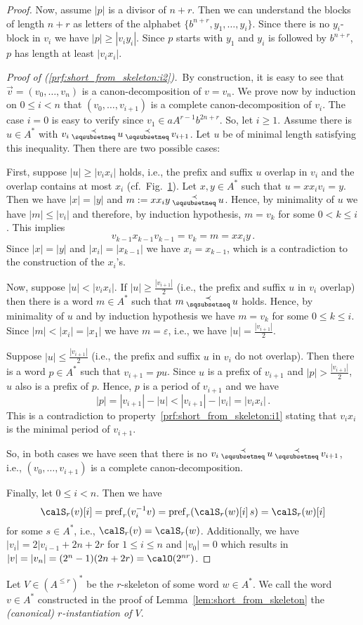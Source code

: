 \begin{proof}
	Now, assume $|p|$ is a divisor of $n+r$. Then we can understand the blocks of length $n+r$ as letters of the alphabet $\{b^{n+r},y_1,\dots,y_i\}$. Since there is no $y_i$-block in $v_i$ we have $|p|\geq|v_iy_i|$. Since $p$ starts with $y_1$ and $y_i$ is followed by $b^{n+r}$, $p$ has length at least $|v_ix_i|$.
	
	\emph{Proof of (\ref{prf:short_from_skeleton:i2}).}\ By construction, it is easy to see that $\vec{v}=(v_0,\dots,v_n)$ is a canon-decomposition of $v=v_n$. We prove now by induction on $0\leq i<n$ that $(v_0,\dots,v_{i+1})$ is a complete canon-decomposition of $v_i$. The case $i=0$ is easy to verify since $v_1\in aA^{r-1}b^{2n+r}$. So, let $i\geq1$. Assume there is $u\in A^*$ with $v_i\presuf u\presuf v_{i+1}$. Let $u$ be of minimal length satisfying this inequality. Then there are two possible cases:
	
	First, suppose $|u|\geq|v_ix_i|$ holds, i.e., the prefix and suffix $u$ overlap in $v_i$ and the overlap contains at most $x_i$ (cf.\ Fig.~\ref{fig:skeleton}). Let $x,y\in A^*$ such that $u=xx_iv_i=y$. Then we have $|x|=|y|$ and $m:=xx_iy\presuf u$. Hence, by minimality of $u$ we have $|m|\leq|v_i|$ and therefore, by induction hypothesis, $m=v_k$ for some $0< k\leq i$. This implies
	\[v_{k-1}x_{k-1}v_{k-1}=v_k=m=xx_iy\,.\]
	Since $|x|=|y|$ and $|x_i|=|x_{k-1}|$ we have $x_i=x_{k-1}$, which is a contradiction to the construction of the $x_i$'s.
	
	\begin{figure}[h]
		\centering
		\caption{\label{fig:skeleton}}
	\end{figure}
	
	Now, suppose $|u|<|v_ix_i|$. If $|u|\geq\frac{|v_{i+1}|}{2}$ (i.e., the prefix and suffix $u$ in $v_i$ overlap) then there is a word $m\in A^*$ such that $m\presuf u$ holds. Hence, by minimality of $u$ and by induction hypothesis we have $m=v_k$ for some $0\leq k\leq i$. Since $|m|<|x_i|=|x_1|$ we have $m=\varepsilon$, i.e., we have $|u|=\frac{|v_{i+1}|}{2}$.
	
	Suppose $|u|\leq\frac{|v_{i+1}|}{2}$ (i.e., the prefix and suffix $u$ in $v_i$ do not overlap). Then there is a word $p\in A^*$ such that $v_{i+1}=pu$. Since $u$ is a prefix of $v_{i+1}$ and $|p|>\frac{|v_{i+1}|}{2}$, $u$ also is a prefix of $p$. Hence, $p$ is a period of $v_{i+1}$ and we have
	\[|p|=|v_{i+1}|-|u|<|v_{i+1}|-|v_i|=|v_ix_i|\,.\]
	This is a contradiction to property~\ref{prf:short_from_skeleton:i1} stating that $v_ix_i$ is the minimal period of $v_{i+1}$.
	
	So, in both cases we have seen that there is no $v_i\presuf u\presuf v_{i+1}$, i.e., $(v_0,\dots,v_{i+1})$ is a complete canon-decomposition.
	
	Finally, let $0\leq i<n$. Then we have
	\[\calS_r(v)[i]=\pref_r(\inv{v_i}v)=\pref_r(\calS_r(w)[i]\,s)=\calS_r(w)[i]\]
	for some $s\in A^*$, i.e., $\calS_r(v)=\calS_r(w)$. Additionally, we have $|v_i|=2|v_{i-1}+2n+2r$ for $1\leq i\leq n$ and $|v_0|=0$ which results in $|v|=|v_n|=(2^n-1)(2n+2r)=\calO(2^{nr})$.
\end{proof}

Let $V\in (A^{\leq r})^*$ be the $r$-skeleton of some word $w\in A^*$. We call the word $v\in A^*$ constructed in the proof of Lemma~\ref{lem:short_from_skeleton} the \emph{(canonical) $r$-instantiation of $V$}.